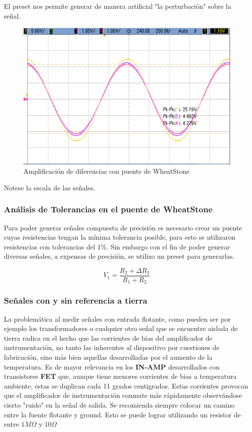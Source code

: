 El preset nos permite generar de manera artificial "la perturbación" sobre la señal.

\begin{figure}[H]
	\centering
	\includegraphics[height=0.3\textheight]{./ImagenesDeOsciloscopio/WheatStone1tierra1c1R.png}
	\caption{Amplificación de diferencias con puente de WheatStone}
\end{figure}
Notese la escala de las señales.
\subsubsection{Análisis de Tolerancias en el puente de WheatStone}
Para poder generar señales compuesta de precisión es necesario crear un puente cuyas resistencias tengan la mínima tolerancia posible, para esto se utilizaron resistencias con tolerancias del 1\%. Sin embargo con el fin de poder generar diversas señales, a expensas de precisión, se utilizo un preset para generarlas.

\begin{equation}
V_1 = \frac{R_2+\Delta R_2}{R_1+R_2}
\end{equation}





\subsubsection{Señales con y sin referencia a tierra}
La problemática al medir señales con entrada flotante, como pueden ser por ejemplo los transformadores o cualquier otro señal que se encuentre aislada de tierra radica en el hecho que las corrientes de bias del amplificador de instrumentación, no tanto las inherentes al dispositivo por cuestiones de fabricación, sino más bien aquellas desarrolladas por el aumento de la temperatura. Es de mayor relevancia en los \textbf{IN-AMP} desarrollados con transistores \textbf{FET} que, aunque tiene menores corrientes de bias a temperatura ambiente, estas se duplican cada 11 grados centigrados. Estas corrientes provocan que el amplificador de instrumentación conmute más rápidamente observándose cierto "ruido" en la señal de salida. Se recomienda siempre colocar un camino entre la fuente flotante y ground. Esto se puede lograr utilizando un resistor de entre $1M\Omega$ y  $10\Omega$

